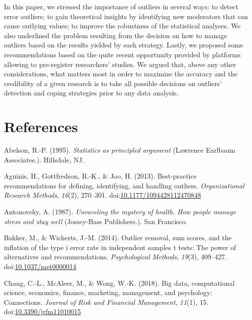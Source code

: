 \documentclass[man,floatsintext]{apa6}
\begin{document}
In this paper, we stressed the importance of outliers in several ways: to detect error outliers; to gain theoretical insights by identifying new moderators that can cause outlying values; to improve the robustness of the statistical analyses. We also underlined the problem resulting from the decision on how to manage outliers based on the results yielded by each strategy. Lastly, we proposed some recommendations based on the quite recent opportunity provided by platforms allowing to pre-register researchers' studies. We argued that, above any other considerations, what matters most in order to maximize the accuracy and the credibility of a given research is to take all possible decisions on outliers' detection and coping strategies prior to any data analysis.

\newpage

\hypertarget{references}{%
\section{References}\label{references}}

\setlength{\parindent}{-0.5in}
\setlength{\leftskip}{0.5in}

\hypertarget{refs}{}
\leavevmode\hypertarget{ref-Abelson_1995}{}%
Abelson, R.-P. (1995). \emph{Statistics as principled argument} (Lawrence Earlbaum Associates.). Hillsdale, NJ.

\leavevmode\hypertarget{ref-Aguinis_et_al_2013}{}%
Aguinis, H., Gottfredson, R.-K., \& Joo, H. (2013). Best-practice recommendations for defining, identifying, and handling outliers. \emph{Organizational Research Methods}, \emph{16}(2), 270--301. doi:\href{https://doi.org/10.1177/1094428112470848}{10.1177/1094428112470848}

\leavevmode\hypertarget{ref-Antonovsky_1987}{}%
Antonovsky, A. (1987). \emph{Unraveling the mystery of health. How people manage stress and stay well} (Jossey-Bass Publishers.). San Francisco.

\leavevmode\hypertarget{ref-Bakker_and_Wicherts_2014}{}%
Bakker, M., \& Wicherts, J.-M. (2014). Outlier removal, sum scores, and the inflation of the type i error rate in independent samples t tests: The power of alternatives and recommendations. \emph{Psychological Methods}, \emph{19}(3), 409--427. doi:\href{https://doi.org/10.1037/met0000014}{10.1037/met0000014}

\leavevmode\hypertarget{ref-Chang_et_al_2018}{}%
Chang, C.-L., McAleer, M., \& Wong, W.-K. (2018). Big data, computational science, economics, finance, marketing, management, and psychology: Connections. \emph{Journal of Risk and Financial Management}, \emph{11}(1), 15. doi:\href{https://doi.org/10.3390/jrfm11010015}{10.3390/jrfm11010015}
\end{document}

